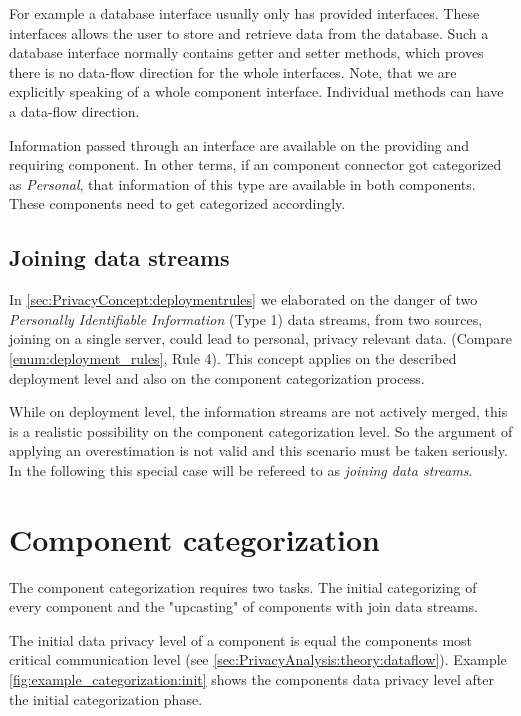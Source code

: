 For example a database interface usually only has provided interfaces. These interfaces allows the user to store and retrieve data from the database. Such a database interface normally contains getter and setter methods, which proves there is no data-flow direction for the whole interfaces. Note, that we are explicitly speaking of a whole component interface. Individual methods can have a data-flow direction.

Information passed through an interface are available on the providing and requiring component. In other terms, if an component connector got categorized as \textit{Personal}, that information of this type are available in both components. These components need to get categorized accordingly.

\subsection{Joining data streams}
\label{sec:PrivacyAnalysis:theory:jds}
In \autoref{sec:PrivacyConcept:deploymentrules} we elaborated on the danger of two \textit{Personally Identifiable Information} (Type 1) data streams, from two sources, joining on a single server, could lead to personal, privacy relevant data. (Compare \autoref{enum:deployment_rules}, Rule 4). This concept applies on the described deployment level and also on the component categorization process.

While on deployment level, the information streams are not actively merged, this is a realistic possibility on the component categorization level. So the argument of applying an overestimation is not valid and this scenario must be taken seriously. In the following this special case will be refereed to as \textit{joining data streams}.


\section{Component categorization}
\label{sec:PrivacyAnalysis:categorization}

The component categorization requires two tasks. The initial categorizing of every component and the "upcasting" of components with join data streams.

The initial data privacy level of a component is equal the components most critical communication level (see \autoref{sec:PrivacyAnalysis:theory:dataflow}). Example \autoref{fig:example_categorization:init} shows the components data privacy level after the initial categorization phase.

